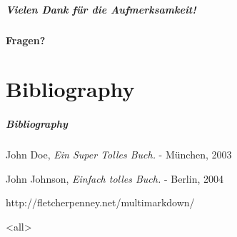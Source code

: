 \begin{frame}

\frametitle{Vielen Dank für die Aufmerksamkeit!}
\label{vielendankfrdieaufmerksamkeit}

\textbf{Fragen?}

\end{frame}

\part{Bibliography}
\begin{frame}[allowframebreaks]
\frametitle{Bibliography}
\def\newblock{}
\begin{thebibliography}{0}
John Doe, \emph{Ein Super Tolles Buch.} - München, 2003


John Johnson, \emph{Einfach tolles Buch.} - Berlin, 2004


http:/\slash fletcherpenney.net\slash multimarkdown\slash 


\end{thebibliography}
\end{frame}

\mode<all>


\mode*

